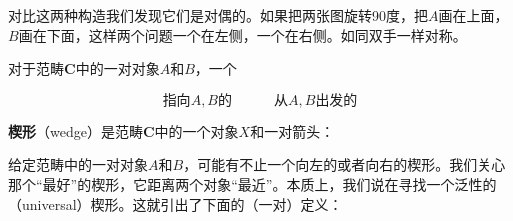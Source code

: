 \documentclass{article}
\begin{document}
对比这两种构造我们发现它们是对偶的。如果把两张图旋转90度，把$A$画在上面，$B$画在下面，这样两个问题一个在左侧，一个在右侧。如同双手一样对称。

\begin{definition}
对于范畴$\pmb{C}$中的一对对象$A$和$B$，一个

\[
\text{指向$A, B$的} \quad \quad \quad \text{从$A, B$出发的}
\]

\textbf{楔形}（wedge）是范畴$\pmb{C}$中的一个对象$X$和一对箭头：

\begin{center}
\end{center}
\end{definition}

给定范畴中的一对对象$A$和$B$，可能有不止一个向左的或者向右的楔形。我们关心那个“最好”的楔形，它距离两个对象“最近”。本质上，我们说在寻找一个泛性的（universal）楔形。这就引出了下面的（一对）定义：
\end{document}
